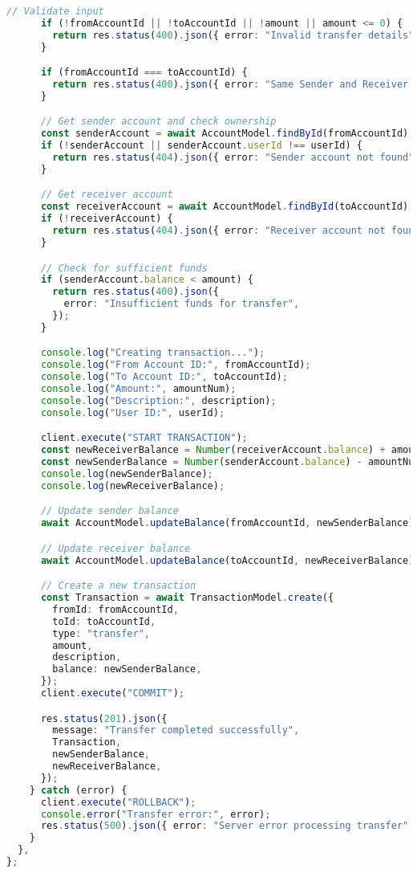\begin{lstlisting}[language=TypeScript]
      // Validate input
      if (!fromAccountId || !toAccountId || !amount || amount <= 0) {
        return res.status(400).json({ error: "Invalid transfer details" });
      }

      if (fromAccountId === toAccountId) {
        return res.status(400).json({ error: "Same Sender and Receiver accounts" });
      }

      // Get sender account and check ownership
      const senderAccount = await AccountModel.findById(fromAccountId);
      if (!senderAccount || senderAccount.userId !== userId) {
        return res.status(404).json({ error: "Sender account not found" });
      }

      // Get receiver account
      const receiverAccount = await AccountModel.findById(toAccountId);
      if (!receiverAccount) {
        return res.status(404).json({ error: "Receiver account not found" });
      }

      // Check for sufficient funds
      if (senderAccount.balance < amount) {
        return res.status(400).json({
          error: "Insufficient funds for transfer",
        });
      }

      console.log("Creating transaction...");
      console.log("From Account ID:", fromAccountId);
      console.log("To Account ID:", toAccountId);
      console.log("Amount:", amountNum);
      console.log("Description:", description);
      console.log("User ID:", userId);

      client.execute("START TRANSACTION");
      const newReceiverBalance = Number(receiverAccount.balance) + amountNum;
      const newSenderBalance = Number(senderAccount.balance) - amountNum;
      console.log(newSenderBalance);
      console.log(newReceiverBalance);

      // Update sender balance
      await AccountModel.updateBalance(fromAccountId, newSenderBalance);

      // Update receiver balance
      await AccountModel.updateBalance(toAccountId, newReceiverBalance);

      // Create a new transaction
      const Transaction = await TransactionModel.create({
        fromId: fromAccountId,
        toId: toAccountId,
        type: "transfer",
        amount,
        description,
        balance: newSenderBalance,
      });
      client.execute("COMMIT");

      res.status(201).json({
        message: "Transfer completed successfully",
        Transaction,
        newSenderBalance,
        newReceiverBalance,
      });
    } catch (error) {
      client.execute("ROLLBACK");
      console.error("Transfer error:", error);
      res.status(500).json({ error: "Server error processing transfer" });
    }
  },
};
\end{lstlisting}

